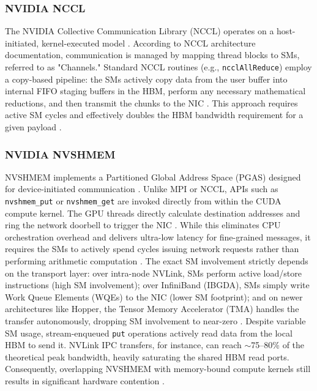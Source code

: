 \documentclass[twocolumn, secnumarabic, amssymb, nobibnotes, aps, prd, amsmath, nofootinbib]{revtex4-2}
\begin{document}
\subsubsection{NVIDIA NCCL}
The NVIDIA Collective Communication Library (NCCL) operates on a host-initiated, kernel-executed model \cite{nvidia_nccl_doc}. According to NCCL architecture documentation, communication is managed by mapping thread blocks to SMs, referred to as "Channels." Standard NCCL routines (e.g., \texttt{ncclAllReduce}) employ a copy-based pipeline: the SMs actively copy data from the user buffer into internal FIFO staging buffers in the HBM, perform any necessary mathematical reductions, and then transmit the chunks to the NIC \cite{meta2025ncclx, unat2024landscape}. This approach requires active SM cycles and effectively doubles the HBM bandwidth requirement for a given payload \cite{agrawal2024optimizing}.

\subsubsection{NVIDIA NVSHMEM}
NVSHMEM implements a Partitioned Global Address Space (PGAS) designed for device-initiated communication \cite{nvidia_nvshmem_doc}. Unlike MPI or NCCL, APIs such as \texttt{nvshmem\_put} or \texttt{nvshmem\_get} are invoked directly from within the CUDA compute kernel. The GPU threads directly calculate destination addresses and ring the network doorbell to trigger the NIC \cite{unat2024landscape}. While this eliminates CPU orchestration overhead and delivers ultra-low latency for fine-grained messages, it requires the SMs to actively spend cycles issuing network requests rather than performing arithmetic computation \cite{hwang2023ark}. The exact SM involvement strictly depends on the transport layer: over intra-node NVLink, SMs perform active load/store instructions (high SM involvement); over InfiniBand (IBGDA), SMs simply write Work Queue Elements (WQEs) to the NIC (lower SM footprint); and on newer architectures like Hopper, the Tensor Memory Accelerator (TMA) handles the transfer autonomously, dropping SM involvement to near-zero \cite{nvidia_hopper_tma}. Despite variable SM usage, stream-enqueued \texttt{put} operations actively read data from the local HBM to send it. NVLink IPC transfers, for instance, can reach $\sim$75--80\% of the theoretical peak bandwidth, heavily saturating the shared HBM read ports. Consequently, overlapping NVSHMEM with memory-bound compute kernels still results in significant hardware contention \cite{nvidia_nvshmem_doc}.
\end{document}
